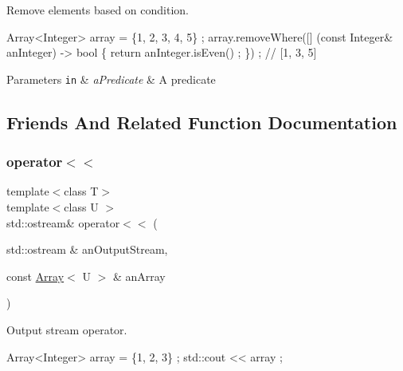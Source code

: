 Remove elements based on condition. 


\begin{DoxyCode}
Array<Integer> array = \{1, 2, 3, 4, 5\} ;
array.removeWhere([] (\textcolor{keyword}{const} Integer& anInteger) -> \textcolor{keywordtype}{bool} \{ \textcolor{keywordflow}{return} anInteger.isEven() ; \}) ; \textcolor{comment}{// [1, 3, 5]}
\end{DoxyCode}



\begin{DoxyParams}[1]{Parameters}
\mbox{\tt in}  & {\em a\+Predicate} & A predicate \\
\hline
\end{DoxyParams}


\subsection{Friends And Related Function Documentation}
\mbox{\label{classlibrary_1_1core_1_1ctnr_1_1_array_a9daa2d638e5bd693776f8bf6caae0802}} 
\subsubsection{\texorpdfstring{operator$<$$<$}{operator<<}}
{\footnotesize\ttfamily template$<$class T$>$ \\
template$<$class U $>$ \\
std\+::ostream\& operator$<$$<$ (\begin{DoxyParamCaption}\item[{std\+::ostream \&}]{an\+Output\+Stream,  }\item[{const \hyperlink{classlibrary_1_1core_1_1ctnr_1_1_array}{Array}$<$ U $>$ \&}]{an\+Array }\end{DoxyParamCaption})\hspace{0.3cm}{\ttfamily [friend]}}



Output stream operator. 


\begin{DoxyCode}
Array<Integer> array = \{1, 2, 3\} ;
std::cout << array ;
\end{DoxyCode}



